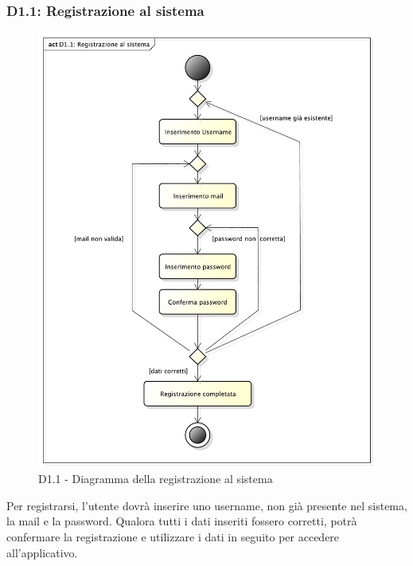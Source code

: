 

		\subsubsection{D1.1: Registrazione al sistema} %
		\label{ssub:registrazione_al_sistema}
		\begin{figure}[!htbp]
			\centering
			\centerline{\includegraphics[scale=0.45]{./images/D1_1.pdf}}
			\caption{D1.1 - Diagramma della registrazione al sistema}
		\end{figure}
		\noindent
		Per registrarsi, l'utente dovrà inserire uno username, non già presente nel sistema, la mail e la password. Qualora tutti i dati inseriti fossero corretti, potrà confermare la registrazione e utilizzare i dati in seguito per accedere all'applicativo.

		\pagebreak

